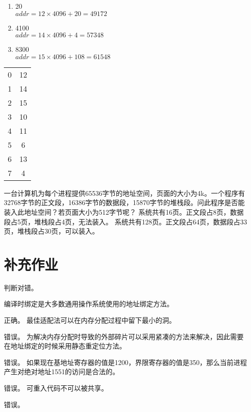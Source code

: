 \documentclass{ctexart}
\begin{document}
\begin{outline}[enumerate]
    \begin{minipage}{.8\textwidth}
    \begin{enumerate}
        \item 20\\ 
            $addr = 12 \times 4096 + 20 = 49172$
        \item 4100\\
            $addr = 14 \times 4096 + 4 = 57348$
        \item 8300 \\
            $addr = 15 \times 4096 + 108 = 61548$
    \end{enumerate}
    \end{minipage}
    \begin{minipage}{.2\textwidth}
            \begin{tabular}{c|c|} 
                \cline{2-2}
                0 & 12  \\ 
                \cline{2-2}
                1 & 14  \\ 
                \cline{2-2}
                2 & 15  \\ 
                \cline{2-2}
                3 & 10  \\ 
                \cline{2-2}
                4 & 11  \\ 
                \cline{2-2}
                5 & 6   \\ 
                \cline{2-2}
                6 & 13  \\ 
                \cline{2-2}
                7 & 4   \\
                \cline{2-2}
            \end{tabular}
    \end{minipage}
    
    \1 一台计算机为每个进程提供65536字节的地址空间，页面的大小为4k。一个程序有32768字节的正文段，16386字节的数据段，15870字节的堆栈段。问此程序是否能装入此地址空间？若页面大小为512字节呢？
        \2 系统共有16页。正文段占8页，数据段占5页，堆栈段占4页，无法装入。
        \2 系统共有128页。正文段占64页，数据段占33页，堆栈段占30页，可以装入。
\end{outline}

\section*{补充作业}
判断对错。
\begin{outline}
    \1 编译时绑定是大多数通用操作系统使用的地址绑定方法。

        正确。
    \1 最佳适配法可以在内存分配过程中留下最小的洞。

        错误。
    \1 为解决内存分配时导致的外部碎片可以采用紧凑的方法来解决，因此需要在地址绑定的时候采用静态重定位方法。

        错误。
    \1 如果现在基地址寄存器的值是1200，界限寄存器的值是350，那么当前进程产生对绝对地址1551的访问是合法的。

        错误。
    \1 可重入代码不可以被共享。

        错误。

\end{outline}
\end{document}
